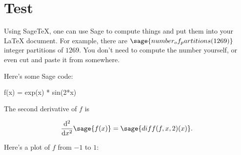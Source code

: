 \section{Test}
Using Sage\TeX, one can use Sage to compute things and put them into
your \LaTeX{} document. For example, there are
$\sage{number_of_partitions(1269)}$ integer partitions of $1269$.
You don't need to compute the number yourself, or even cut and paste
it from somewhere.

Here's some Sage code:

\begin{sageblock}
    f(x) = exp(x) * sin(2*x)
\end{sageblock}

The second derivative of $f$ is

\[
  \frac{\mathrm{d}^{2}}{\mathrm{d}x^{2}} \sage{f(x)} =
  \sage{diff(f, x, 2)(x)}.
\]

Here's a plot of $f$ from $-1$ to $1$:



